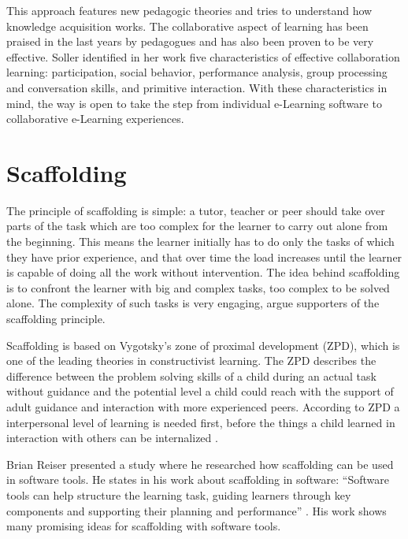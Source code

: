 This approach features new pedagogic theories and tries to
understand how knowledge acquisition works. The collaborative aspect of
learning has been praised in the last years by pedagogues and has also been
proven to be very effective. Soller identified in her work \cite{Soller2001}
five characteristics of effective collaboration learning: participation,
social behavior, performance analysis, group processing and conversation
skills, and primitive interaction. With these characteristics in mind, the way
is open to take the step from individual e-Learning software to collaborative
e-Learning experiences.

\section{Scaffolding}
\label{scaffolding}
The principle of scaffolding is simple: a tutor, teacher or peer should take
over parts of the task which are too complex for the learner to carry out
alone from the beginning. This means the learner initially has to do only the tasks
of which they have prior experience, and that over time the load increases until
the learner is capable of doing all the work without intervention. The idea
behind scaffolding is to confront the learner
with big and complex tasks, too complex to be solved alone. The complexity of
such tasks is very engaging, argue supporters of the scaffolding principle.

Scaffolding is based on Vygotsky's zone of proximal development (ZPD), which is one
of the leading theories in constructivist learning. The  ZPD describes the
difference between the problem solving skills of a child during an actual task
without guidance and the potential level a child could reach with the support
of adult guidance and interaction with more experienced peers. According to
ZPD a interpersonal level of learning is needed first, before the things
a child learned in interaction with others can be internalized \cite{Roehler1997a}.

Brian Reiser presented a study where he researched how scaffolding can be used in
software tools. He states in his work about scaffolding in software: ``Software tools can
help structure the learning task, guiding learners through key components and
supporting their planning and performance'' \cite{Reiser2004a}. His work shows
many promising ideas for scaffolding with software tools.

